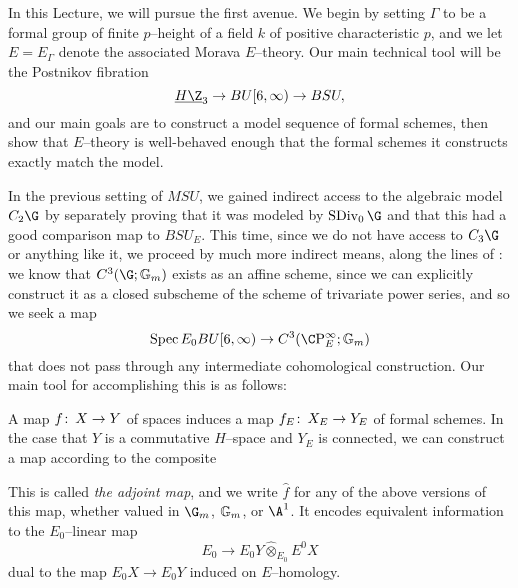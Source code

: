 In this Lecture, we will pursue the first avenue.  We begin by setting $\Gamma$ to be a formal group of finite $p$--height of a field $k$ of positive characteristic $p$, and we let $E = E_\Gamma$ denote the associated Morava $E$--theory.  Our main technical tool will be the Postnikov fibration \[\OS{H\Z}{3} \to BU[6, \infty) \to BSU,\] and our main goals are to construct a model sequence of formal schemes, then show that $E$--theory is well-behaved enough that the formal schemes it constructs exactly match the model.

In the previous setting of $MSU$, we gained indirect access to the algebraic model $C_2 \G$ by separately proving that it was modeled by $\SDiv_0 \G$ and that this had a good comparison map to $BSU_E$.  This time, since we do not have access to $C_3 \G$ or anything like it, we proceed by much more indirect means, along the lines of : we know that $C^3(\G; \Gm)$ exists as an affine scheme, since we can explicitly construct it as a closed subscheme of the scheme of trivariate power series, and so we seek a map \[\Spec E_0 BU[6, \infty) \to C^3(\CP^\infty_E; \Gm)\] that does not pass through any intermediate cohomological construction.  Our main tool for accomplishing this is as follows:
\begin{definition}
A map $f\colon\thinspace X \to Y$ of spaces induces a map $f_E \colon\thinspace X_E \to Y_E$ of formal schemes.  In the case that $Y$ is a commutative $H$--space and $Y_E$ is connected, we can construct a map according to the composite
\begin{center}
\end{center}
This is called \textit{the adjoint map}, and we write $\widehat f$ for any of the above versions of this map, whether valued in $\G_m$, $\mathbb G_m$, or $\A^1$.  It encodes equivalent information to the $E_0$--linear map \[E_0 \to E_0 Y \widehat\otimes_{E_0} E^0 X\] dual to the map $E_0 X \to E_0 Y$ induced on $E$--homology.
\end{definition}

